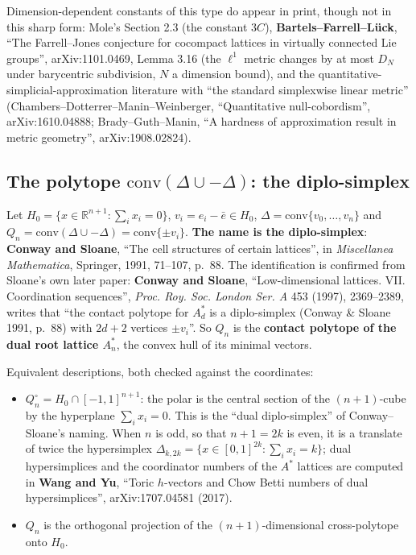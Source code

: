 \documentclass[
]{article}
\providecommand{\tightlist}{%
  \setlength{\itemsep}{0pt}\setlength{\parskip}{0pt}}
\begin{document}
Dimension-dependent constants of this type do appear in print, though
not in this sharp form: Mole's Section 2.3 (the constant \(3C\)),
\textbf{Bartels--Farrell--L\"{u}ck}, ``The Farrell--Jones conjecture for
cocompact lattices in virtually connected Lie groups'', arXiv:1101.0469,
Lemma 3.16 (the \(\ell^1\) metric changes by at most \(D_N\) under
barycentric subdivision, \(N\) a dimension bound), and the
quantitative-simplicial-approximation literature with ``the standard
simplexwise linear metric'' (Chambers--Dotterrer--Manin--Weinberger,
``Quantitative null-cobordism'', arXiv:1610.04888; Brady--Guth--Manin,
``A hardness of approximation result in metric geometry'',
arXiv:1908.02824).

\subsection{\texorpdfstring{The polytope
\(\mathrm{conv}(\Delta\cup-\Delta)\): the
diplo-simplex}{The polytope \textbackslash mathrm\{conv\}(\textbackslash Delta\textbackslash cup-\textbackslash Delta): the diplo-simplex}}\label{the-polytope-mathrmconvdeltacup-delta-the-diplo-simplex}

Let \(H_0=\{x\in\mathbb R^{n+1}:\sum_i x_i=0\}\),
\(v_i=e_i-\bar e\in H_0\), \(\Delta=\mathrm{conv}\{v_0,\dots,v_n\}\) and
\(Q_n=\mathrm{conv}(\Delta\cup-\Delta)=\mathrm{conv}\{\pm v_i\}\).
\textbf{The name is the diplo-simplex}: \textbf{Conway and Sloane},
``The cell structures of certain lattices'', in \emph{Miscellanea
Mathematica}, Springer, 1991, 71--107, p.~88. The identification is
confirmed from Sloane's own later paper: \textbf{Conway and Sloane},
``Low-dimensional lattices. VII. Coordination sequences'', \emph{Proc.
Roy. Soc. London Ser. A} 453 (1997), 2369--2389, writes that ``the
contact polytope for \(A_d^*\) is a diplo-simplex (Conway \& Sloane
1991, p.~88) with \(2d+2\) vertices \(\pm v_i\)''. So \(Q_n\) is the
\textbf{contact polytope of the dual root lattice \(A_n^*\)}, the convex
hull of its minimal vectors.

Equivalent descriptions, both checked against the coordinates:

\begin{itemize}
\tightlist
\item
  \(Q_n^\circ=H_0\cap[-1,1]^{n+1}\): the polar is the central section of
  the \((n+1)\)-cube by the hyperplane \(\sum_i x_i=0\). This is the
  ``dual diplo-simplex'' of Conway--Sloane's naming. When \(n\) is odd,
  so that \(n+1=2k\) is even, it is a translate of twice the
  hypersimplex \(\Delta_{k,2k}=\{x\in[0,1]^{2k}:\sum_i x_i=k\}\); dual
  hypersimplices and the coordinator numbers of the \(A^*\) lattices are
  computed in \textbf{Wang and Yu}, ``Toric \(h\)-vectors and Chow Betti
  numbers of dual hypersimplices'', arXiv:1707.04581 (2017).
\item
  \(Q_n\) is the orthogonal projection of the \((n+1)\)-dimensional
  cross-polytope onto \(H_0\).
\end{itemize}
\end{document}
